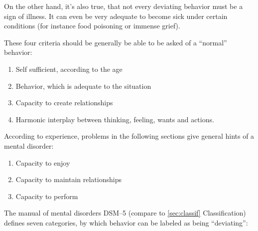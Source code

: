 \documentclass[../main.tex]{subfiles}
\begin{document}
On the other hand, it's also true, that not every deviating behavior must be a sign of illness.
It can even be very adequate to become sick under certain conditions
(for instance food poisoning or immense grief).

\noindent These four criteria should be generally be able to be asked of a ``normal'' behavior:

\begin{enumerate}
\item Self sufficient, according to the age
\item Behavior, which is adequate to the situation
\item Capacity to create relationships
  \item Harmonic interplay between thinking, feeling, wants and actions.
\end{enumerate}

\noindent According to experience, problems in the following sections give general hints of a mental disorder:

\begin{enumerate}
\item Capacity to enjoy
\item Capacity to maintain relationships
  \item Capacity to perform
\end{enumerate}

The manual of mental disorders DSM--5 (compare to \ref{sec:classif} Classification) defines seven categories,
by which behavior can be labeled as being ``deviating'':
\end{document}
